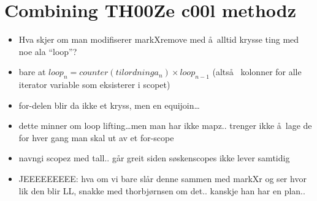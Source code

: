 \section{Combining TH00Ze c00l methodz}
\begin{itemize}
  \item Hva skjer om man modifiserer markXremove med \aa~alltid krysse ting med
  noe ala ``loop''?
  \item bare at $loop_{n} = counter(tilordninga_{n}) \times loop_{n-1}$
  (alts\aa~ kolonner for alle iterator variable som eksisterer i scopet)
  \item for-delen blir da ikke et kryss, men en equijoin\ldots
  \item dette minner om loop lifting\ldots men man har ikke mapz.. trenger ikke
  \aa~lage de for hver gang man skal ut av et for-scope
  \item navngi scopez med tall.. g\aa r greit siden s\o skenscopes ikke lever
  samtidig
  \item JEEEEEEEEE: hva om vi bare sl\aa r denne sammen med markXr og ser hvor lik den blir LL, snakke med
  thorbj\o rnsen om det.. kanskje han har en plan..
\end{itemize}
